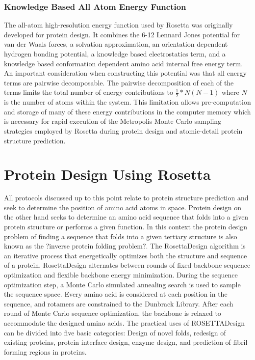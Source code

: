 \subsubsection{Knowledge Based All Atom Energy Function}
The all-atom high-resolution energy function used by Rosetta was originally developed for protein design\citep{Kuhlman:2000tc,Kuhlman:2003kp}.
It combines the 6-12 Lennard Jones potential for van der Waals forces, a solvation approximation\citep{Lazaridis:1999wi}, an orientation dependent hydrogen bonding potential\citep{Kortemme:2003td}, a knowledge based electrostatics term, and a knowledge based conformation dependent amino acid internal free energy term\citep{Dunbrack:1993jt}.
An important consideration when constructing this potential was that all energy terms are pairwise decomposable.
The pairwise decomposition of each of the terms limits the total number of energy contributions to $\frac{1}{2}*N(N-1)$ where $N$ is the number of atoms within the system.
This limitation allows pre-computation and storage of many of these energy contributions in the computer memory which is necessary for rapid execution of the Metropolis Monte Carlo sampling strategies employed by Rosetta during protein design and atomic-detail protein structure prediction.

\section{Protein Design Using Rosetta}
All protocols discussed up to this point relate to protein structure prediction and seek to determine the position of amino acid atoms in space.
Protein design on the other hand seeks to determine an amino acid sequence that folds into a given protein structure or performs a given function.
In this context the protein design problem of finding a sequence that folds into a given tertiary structure is also known as the ?inverse protein folding problem?.
The RosettaDesign\citep{Kuhlman:2003kp} algorithm is an iterative process that energetically optimizes both the structure and sequence of a protein.
RosettaDesign alternates between rounds of fixed backbone sequence optimization and flexible backbone energy minimization\citep{Kuhlman:2003kp}.
During the sequence optimization step, a Monte Carlo simulated annealing search is used to sample the sequence space.
Every amino acid is considered at each position in the sequence, and rotamers are constrained to the Dunbrack Library\citep{Dunbrack:1993jt}.
After each round of Monte Carlo sequence optimization, the backbone is relaxed to accommodate the designed amino acids\citep{Kuhlman:2003kp}.
The practical uses of ROSETTADesign can be divided into five basic categories: Design of novel folds\citep{Kuhlman:2003kp}, redesign of existing proteins\citep{Korkegian:2005it}, protein interface design, enzyme design\citep{Jiang:2008jk}, and prediction of fibril forming regions in proteins\citep{Thompson:2006cj}.

